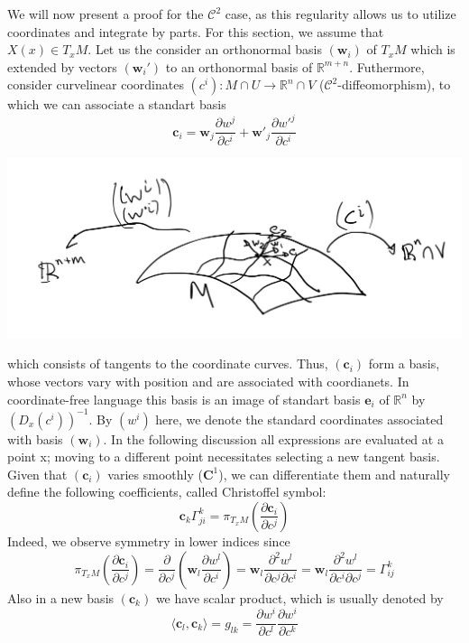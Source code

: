 \vspace{2ex}
We will now present a proof for the $\mathcal C^2$ case, as this regularity allows
us to utilize coordinates and integrate by parts. For this section, we assume that $X(x)\in
T_xM$. Let us the consider an orthonormal basis $(\mathbf w_i)$ of $T_xM$
which is extended by vectors $(\mathbf w_i')$ to an orthonormal basis of
$\mathbb R^{m+n}$. Futhermore, consider curvelinear coordinates $(c^i):M\cap
U\rightarrow \mathbb{R}^n\cap V$ ($\mathcal C^2$-diffeomorphism), to which we can
associate a standart basis 
\[\mathbf{c}_i=\mathbf{w}_j\frac{\partial w^j}{\partial c^i}+\mathbf{w'}_j\frac{\partial w'^j}{\partial c^i}\]
\begin{center}
\includegraphics[scale=0.2]{maps.png}
\end{center}
which consists of tangents to the coordinate curves. Thus, $(\mathbf c_i)$ form a
basis, whose vectors vary with position and are associated with coordianets. In coordinate-free
language this basis is an image of standart basis $\mathbf e_i$ of $\mathbb R^n$
by $(D_x(c^i))^{-1}$. By $(w^i)$
here, we denote the standard coordinates associated with basis $(\mathbf w_i)$. In the
following discussion all expressions are evaluated at a point x; moving to a
different point necessitates selecting a new tangent basis. Given that $(\mathbf c_i)$
varies smoothly ($\mathbf C^1$), we can differentiate them and
naturally define the following coefficients, called Christoffel symbol:
\[\mathbf c_k\Gamma_{ji}^k=\pi_{T_x M}(\frac{\partial\mathbf{c}_i}{\partial c^j})\]
Indeed, we observe symmetry in lower indices since
\[\pi_{T_xM}(\frac{\partial\mathbf{c}_i}{\partial c^j}) = \frac{\partial}{\partial c^j}(\mathbf{w}_l\frac{\partial w^l}{\partial c^i})
=\mathbf{w}_l\frac{\partial^2 w^l}{\partial c^j\partial c^i}=\mathbf{w}_l\frac{\partial^2 w^l}{\partial c^i\partial c^j}
=\Gamma_{ij}^k\]
Also in a new basis $(\mathbf{c}_k)$ we have scalar product, which is usually denoted by
\[\langle\mathbf{c}_l,\mathbf{c}_k\rangle=g_{lk}=\frac{\partial w^i}{\partial c^l}\frac{\partial w^i}{\partial c^k}\]
